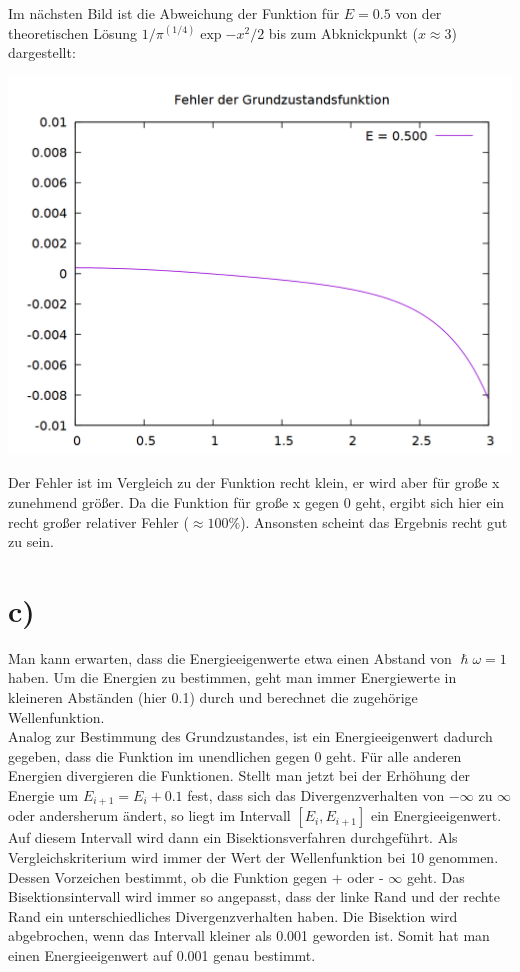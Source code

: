 \documentclass{scrreprt}
\begin{document}
Im nächsten Bild ist die Abweichung der Funktion für $E = 0.5$ von der theoretischen Lösung $1/\pi^{(1/4)}\exp{-x^2/2}$ bis zum Abknickpunkt ($x\approx 3$) dargestellt:

\begin{center}
\includegraphics[scale=0.3]{aufgabe3/plot_ground_diff.png}
\end{center}

Der Fehler ist im Vergleich zu der Funktion recht klein, er wird aber für große x zunehmend größer. Da die Funktion für große x gegen 0 geht, ergibt sich hier ein recht großer relativer Fehler ($\approx 100\%$). Ansonsten scheint das Ergebnis recht gut zu sein.

\section*{c)}
Man kann erwarten, dass die Energieeigenwerte etwa einen Abstand von $\hslash \omega = 1$ haben. Um die Energien zu bestimmen, geht man immer Energiewerte in kleineren Abständen (hier 0.1) durch und berechnet die zugehörige Wellenfunktion.\\
Analog zur Bestimmung des Grundzustandes, ist ein Energieeigenwert dadurch gegeben, dass die Funktion im unendlichen gegen 0 geht. Für alle anderen Energien divergieren die Funktionen. Stellt man jetzt bei der Erhöhung der Energie um $E_{i+1} = E_i + 0.1$ fest, dass sich das Divergenzverhalten von $-\infty$ zu $\infty$ oder andersherum ändert, so liegt im Intervall $[E_i, E_{i+1}]$  ein Energieeigenwert.\\
Auf diesem Intervall wird dann ein Bisektionsverfahren durchgeführt. Als Vergleichskriterium wird immer der Wert der Wellenfunktion bei 10 genommen. Dessen Vorzeichen bestimmt, ob die Funktion gegen + oder - $\infty$ geht. Das Bisektionsintervall wird immer so angepasst, dass der linke Rand und der rechte Rand ein unterschiedliches Divergenzverhalten haben. Die Bisektion wird abgebrochen, wenn das Intervall kleiner als 0.001 geworden ist. Somit hat man einen Energieeigenwert auf 0.001 genau bestimmt.\\
\end{document}
